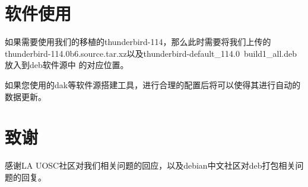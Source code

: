 \documentclass[lang=cn,a4paper,newtx]{elegantpaper}
\begin{document}
\section{软件使用}

如果需要使用我们的移植的thunderbird-114，那么此时需要将我们上传的
thunderbird-114.0b6.source.tar.xz以及thunderbird-default\_114.0~build1\_all.deb放入到deb软件源中
的对应位置。

如果您使用的dak等软件源搭建工具，进行合理的配置后将可以使得其进行自动的数据更新。
\section{致谢}

感谢LA UOSC社区对我们相关问题的回应，以及debian中文社区对deb打包相关问题的回复。


\nocite{*}
\printbibliography[heading=bibintoc, title=\ebibname]

\appendix
\addappheadtotoc
\end{document}
